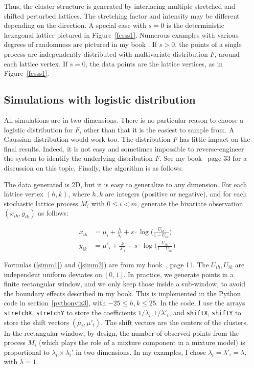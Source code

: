 \documentclass[oneside,10pt]{book}
\begin{document}
Thus, the cluster structure is generated by interlacing multiple stretched and shifted perturbed lattices. The stretching factor and intensity may be different depending on the direction. A special case with $s=0$ is the deterministic hexagonal lattice pictured in Figure~\ref{fcsss1}. Numerous examples with various degrees of randomness are pictured in my book \cite{vgsimulnew}. If $s>0$, the points of a single process are independently distributed with multivariate distribution $F$, around each lattice vertex. If $s=0$, the data points are the lattice vertices, as in 
Figure~\ref{fcsss1}.

\subsection{Simulations with logistic distribution}\label{fcsim}

All simulations are in two dimensions. There is no particular reason to choose a logistic distribution for $F$, other than that it is the easiest to sample from. A Gaussian distribution would work too. The distribution $F$ has little impact on the final results. Indeed, it is not easy 
and sometimes impossible to 
reverse-engineer the system to identify the underlying distribution $F$. See my book~\cite{vgsimulnew} page 33 for a discussion on this topic.
 Finally, the algorithm is as follows:


\noindent The data generated is 2D, but it is easy to generalize to any dimension. For each lattice vertex $(h,k)$, where $h,k$ are integers (positive or negative), and for each stochastic lattice process $M_i$ with $0\leq i < m$, generate the bivariate observation $(x_{ih},y_{ik})$ as follows:

\begin{align}
x_{ih} & =\mu_i + \frac{h}{\lambda_i} +s \cdot \log \Big(\frac{U_{ih}}{1-U_{ih}}\Big) \label{simm1}\\
y_{ik} & =\mu'_i+ \frac{k}{\lambda'_i} +s \cdot \log\Big(\frac{U_{ik}}{1-U_{ik}}\Big) \label{simm2}
\end{align}



\noindent Formulas (\ref{simm1}) and (\ref{simm2}) are from my book~\cite{vgsimulnew}, page 11. The $U_{ih},U_{ik}$ are independent uniform deviates on $[0,1]$. In practice, we generate points in a finite rectangular window, and we only keep those inside a sub-window, to avoid the boundary effects described in my book. This is implemented in the Python code in section~\ref{pythonviz3}, with $-25\leq h,k\leq 25$. In the code, I use the arrays \texttt{stretchX}, \texttt{stretchY} to store the coefficients
$1/\lambda_i,1/\lambda'_i$, and \texttt{shiftX}, \texttt{shiftY} to store the shift vectors $(\mu_i,\mu'_i)$. The shift vectors are the centers of the clusters. In the rectangular window, by design, the 
number of
observed points from the process $M_i$ (which plays the role of a mixture component in a mixture model) is proportional to
$\lambda_i \times \lambda_i'$ in two dimensions. In my examples, I chose $\lambda_i=\lambda'_i=\lambda$, with $\lambda=1$.
\end{document}
